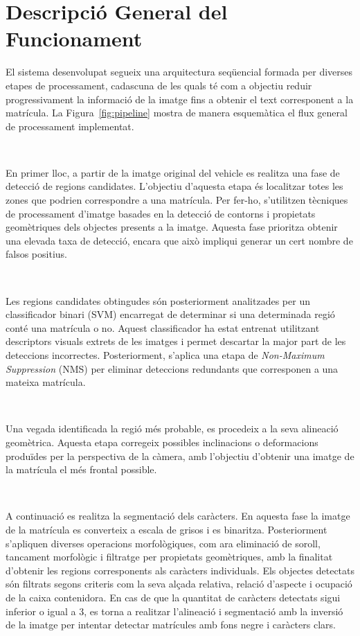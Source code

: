 
\section{Descripció General del Funcionament}

El sistema desenvolupat segueix una arquitectura seqüencial formada per diverses etapes de processament, cadascuna de les quals té com a objectiu reduir progressivament la informació de la imatge fins a obtenir el text corresponent a la matrícula. La Figura~\ref{fig:pipeline} mostra de manera esquemàtica el flux general de processament implementat.

\

En primer lloc, a partir de la imatge original del vehicle es realitza una fase de detecció de regions candidates. L'objectiu d'aquesta etapa és localitzar totes les zones que podrien correspondre a una matrícula. Per fer-ho, s'utilitzen tècniques de processament d'imatge basades en la detecció de contorns i propietats geomètriques dels objectes presents a la imatge. Aquesta fase prioritza obtenir una elevada taxa de detecció, encara que això impliqui generar un cert nombre de falsos positius.

\

Les regions candidates obtingudes són posteriorment analitzades per un classificador binari (SVM) encarregat de determinar si una determinada regió conté una matrícula o no. Aquest classificador ha estat entrenat utilitzant descriptors visuals extrets de les imatges i permet descartar la major part de les deteccions incorrectes. Posteriorment, s'aplica una etapa de \textit{Non-Maximum Suppression} (NMS) per eliminar deteccions redundants que corresponen a una mateixa matrícula.

\

Una vegada identificada la regió més probable, es procedeix a la seva alineació geomètrica. Aquesta etapa corregeix possibles inclinacions o deformacions produïdes per la perspectiva de la càmera, amb l'objectiu d'obtenir una imatge de la matrícula el més frontal possible. 

\

A continuació es realitza la segmentació dels caràcters. En aquesta fase la imatge de la matrícula es converteix a escala de grisos i es binaritza. Posteriorment s'apliquen diverses operacions morfològiques, com ara eliminació de soroll, tancament morfològic i filtratge per propietats geomètriques, amb la finalitat d'obtenir les regions corresponents als caràcters individuals. Els objectes detectats són filtrats segons criteris com la seva alçada relativa, relació d'aspecte i ocupació de la caixa contenidora. En cas de que la quantitat de caràcters detectats sigui inferior o igual a 3, es torna a realitzar l'alineació i segmentació amb la inversió de la imatge per intentar detectar matrícules amb fons negre i caràcters clars.

